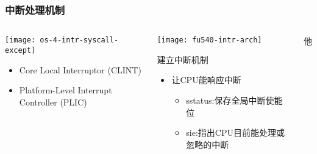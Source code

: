\begin{frame}[plain,t]
	\frametitle{中断处理机制}
	\begin{columns}
		
		\begin{column}{0.45\textwidth}
			\centering
			\texttt{[image: os-4-intr-syscall-except]}
			\begin{itemize} \small
				\item Core Local	Interruptor (CLINT)
				\item Platform-Level Interrupt Controller (PLIC)
			\end{itemize}
			
		\end{column}
		
		\begin{column}{0.5\textwidth}
			
			\texttt{[image: fu540-intr-arch]}	
			
			建立中断机制
			\begin{itemize}
				\item 让CPU能响应中断 \pause
					\begin{itemize}
						\item sstatus:保存全局中断使能位	 \pause
						\item sie:指出CPU目前能处理或忽略的中断 \pause
					\end{itemize}		
			\end{itemize}		
			
		\end{column}他
		
	\end{columns}
	
\end{frame}

